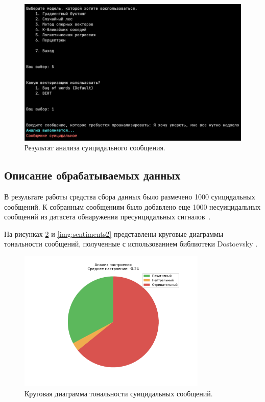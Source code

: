 \begin{figure}[H]
	\centering
	\includegraphics[width=\textwidth]{inc/utility2.png}
	\caption{ Результат анализа суицидального сообщения. }
	\label{img:utility2}
\end{figure}

\subsection{Описание обрабатываемых данных}

В результате работы средства сбора данных было размечено 1000 суицидальных сообщений. К собранным сообщениям было добавлено еще 1000 несуицидальных сообщений из датасета обнаружения пресуицидальных сигналов~\cite{dataset}. 

На рисунках \ref{img:sentiments1} и \ref{img:sentiments2} представлены круговые диаграммы тональности сообщений, полученные с использованием библиотеки Dostoevsky \cite{dostoevsky}.

\begin{figure}[H]
	\centering
	\includegraphics[width=0.8\textwidth]{inc/plots/sentiments_suicidal.pdf}
	\caption{ Круговая диаграмма тональности суицидальных сообщений. }
	\label{img:sentiments1}
\end{figure}

